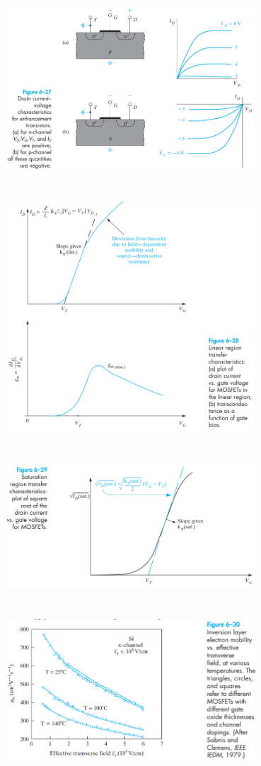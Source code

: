 \documentclass[8pt]{article}
\newcommand{\hl}{\noindent\makebox[\linewidth]{\rule{\textwidth}{0.2pt}}}
\begin{document}
\begin{center}
		\includegraphics[width=0.7\textwidth]{fig6-27} \\ \hl \\~\\
		\includegraphics[width=0.7\textwidth]{fig6-28} \\ \hl \\~\\
		\includegraphics[width=0.7\textwidth]{fig6-29} \\ \hl \\~\\
		\includegraphics[width=0.7\textwidth]{fig6-30} \\ \hl \\~\\

\end{center}
\end{document}
